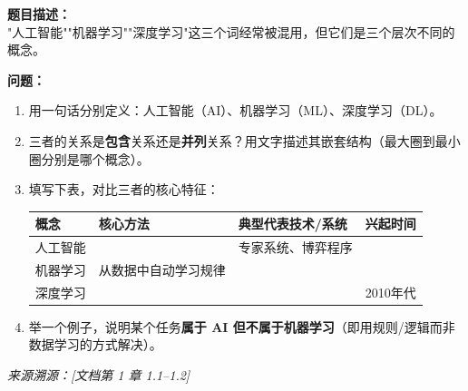 \documentclass[a4paper,11pt]{ctexart}
\begin{document}
\begin{problembox}
    \textbf{题目描述：}\\
    "人工智能""机器学习""深度学习"这三个词经常被混用，但它们是三个层次不同的概念。

    \vspace{0.3cm}
    \textbf{问题：}
    \begin{enumerate}[(1)]
        \item 用一句话分别定义：人工智能（AI）、机器学习（ML）、深度学习（DL）。
        \item 三者的关系是\textbf{包含}关系还是\textbf{并列}关系？用文字描述其嵌套结构（最大圈到最小圈分别是哪个概念）。
        \item 填写下表，对比三者的核心特征：
        \begin{center}
        \begin{tabular}{p{2.8cm} p{3.8cm} p{3.8cm} p{2.8cm}}
            \toprule
            概念 & 核心方法 & 典型代表技术/系统 & 兴起时间 \\
            \midrule
            人工智能 & \underline{\hspace{3cm}} & 专家系统、博弈程序 & \underline{\hspace{1.5cm}} \\[1.2em]
            机器学习 & 从数据中自动学习规律 & \underline{\hspace{3cm}} & \underline{\hspace{1.5cm}} \\[1.2em]
            深度学习 & \underline{\hspace{3cm}} & \underline{\hspace{3cm}} & 2010年代 \\
            \bottomrule
        \end{tabular}
        \end{center}
        \item 举一个例子，说明某个任务\textbf{属于 AI 但不属于机器学习}（即用规则/逻辑而非数据学习的方式解决）。
    \end{enumerate}
    {\color{gray}\small\textit{来源溯源：[文档第 1 章 1.1--1.2]}}
\end{problembox}
\end{document}
